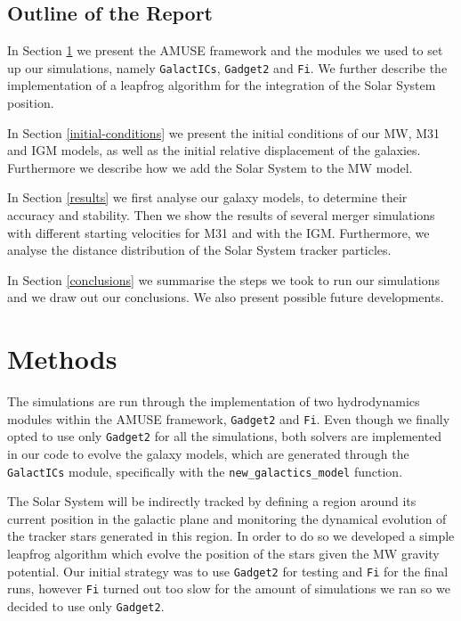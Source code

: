 \documentclass[a4paper,12pt, english]{article}
\begin{document}
\subsection{Outline of the Report}
\label{outline}
In Section \ref{methods} we present the AMUSE framework and the modules we used to set up our simulations, namely \texttt{GalactICs}, \texttt{Gadget2} and \texttt{Fi}. We further describe the implementation of a leapfrog algorithm for the integration of the Solar System position.\par
\smallskip
In Section \ref{initial-conditions} we present the initial conditions of our MW, M31 and IGM models, as well as the initial relative displacement of the galaxies. Furthermore we describe how we add the Solar System to the MW model. \par
\smallskip
In Section \ref{results} we first analyse our galaxy models, to determine their accuracy and stability. Then we show the results of several merger simulations with different starting velocities for M31 and with the IGM. Furthermore, we analyse the distance distribution of the Solar System tracker particles.\par
\smallskip
In Section \ref{conclusions} we summarise the steps we took to run our simulations and we draw out our conclusions. We also present possible future developments.\par
\newpage

\section{Methods}
\label{methods}
The simulations are run through the implementation of two hydrodynamics modules within the AMUSE framework, \texttt{Gadget2} and \texttt{Fi}. Even though we finally opted to use only \texttt{Gadget2} for all the simulations, both solvers are implemented in our code to evolve the galaxy models, which are generated through the \texttt{GalactICs} module, specifically with the \texttt{new\_galactics\_model} function.\par
\smallskip
The Solar System will be indirectly tracked by defining a region around its current position in the galactic plane and monitoring the dynamical evolution of the tracker stars generated in this region. In order to do so we developed a simple leapfrog algorithm which evolve the position of the stars given the MW gravity potential. Our initial strategy was to use \texttt{Gadget2} for testing and \texttt{Fi} for the final runs, however \texttt{Fi} turned out too slow for the amount of simulations we ran so we decided to use only \texttt{Gadget2}.\par
\smallskip
\end{document}
